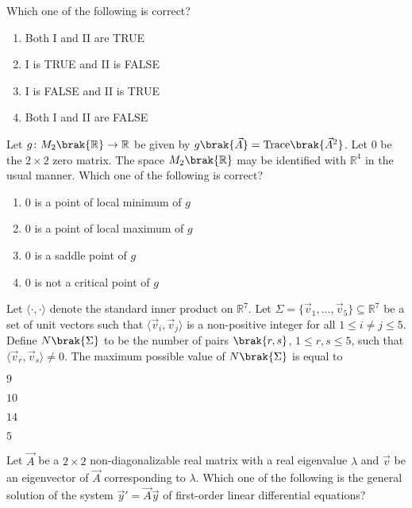 Which one of the following is correct? \hfill{}
\begin{enumerate}
    \item Both I and II are TRUE
    \item I is TRUE and II is FALSE
    \item I is FALSE and II is TRUE
    \item Both I and II are FALSE
\end{enumerate}
\item Let $g \colon M_2\brak{\mathbb{R}} \to \mathbb{R}$ be given by $g\brak{\vec{A}} = \text{Trace}\brak{\vec{A}^2}$. Let $0$ be the $2 \times 2$ zero matrix. The space $M_2\brak{\mathbb{R}}$ may be identified with $\mathbb{R}^4$ in the usual manner. Which one of the following is correct? \hfill{}
\begin{enumerate}
    \item $0$ is a point of local minimum of $g$
    \item $0$ is a point of local maximum of $g$
    \item $0$ is a saddle point of $g$
    \item $0$ is not a critical point of $g$
\end{enumerate}
\item Let $\langle \cdot, \cdot \rangle$ denote the standard inner product on $\mathbb{R}^7$. Let $\Sigma = \{\vec{v}_1, \dots, \vec{v}_5\} \subseteq \mathbb{R}^7$ be a set of unit vectors such that $\langle \vec{v}_i, \vec{v}_j \rangle$ is a non-positive integer for all $1 \le i \neq j \le 5$. Define $N\brak{\Sigma}$ to be the number of pairs $\brak{r, s}$, $1 \le r, s \le 5$, such that $\langle \vec{v}_r, \vec{v}_s \rangle \neq 0$. The maximum possible value of $N\brak{\Sigma}$ is equal to \hfill{}
\begin{enumerate}
    \begin{multicols}{4}
    \item $9$
    \item $10$
    \item $14$
    \item $5$
    \end{multicols}
\end{enumerate}
\item Let $\vec{A}$ be a $2 \times 2$ non-diagonalizable real matrix with a real eigenvalue $\lambda$ and $\vec{v}$ be an eigenvector of $\vec{A}$ corresponding to $\lambda$. Which one of the following is the general solution of the system $\vec{y}' = \vec{A}\vec{y}$ of first-order linear differential equations? \hfill{}
